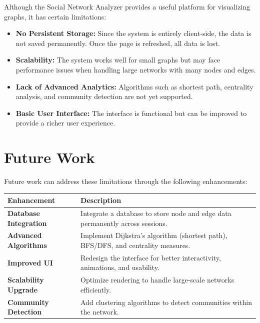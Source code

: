 \documentclass{article}
\begin{document}
Although the Social Network Analyzer provides a useful platform for visualizing graphs, it has certain limitations:

\begin{itemize}[leftmargin=2em, label={\color{MedGray}\faExclamationTriangle}]
  \item \textbf{No Persistent Storage:} Since the system is entirely client-side, the data is not saved permanently. Once the page is refreshed, all data is lost.
  \item \textbf{Scalability:} The system works well for small graphs but may face performance issues when handling large networks with many nodes and edges.
  \item \textbf{Lack of Advanced Analytics:} Algorithms such as shortest path, centrality analysis, and community detection are not yet supported.
  \item \textbf{Basic User Interface:} The interface is functional but can be improved to provide a richer user experience.
\end{itemize}

\section{Future Work}

Future work can address these limitations through the following enhancements:

\begin{center}
\renewcommand{\arraystretch}{1.6}
\begin{tabularx}{\textwidth}{>{\bfseries\color{AccentBlue}}l X}
\toprule
Enhancement & Description \\
\midrule
Database Integration  & Integrate a database to store node and edge data permanently across sessions. \\
Advanced Algorithms   & Implement Dijkstra's algorithm (shortest path), BFS/DFS, and centrality measures. \\
Improved UI           & Redesign the interface for better interactivity, animations, and usability. \\
Scalability Upgrade   & Optimize rendering to handle large-scale networks efficiently. \\
Community Detection   & Add clustering algorithms to detect communities within the network. \\
\bottomrule
\end{tabularx}
\end{center}
\end{document}
